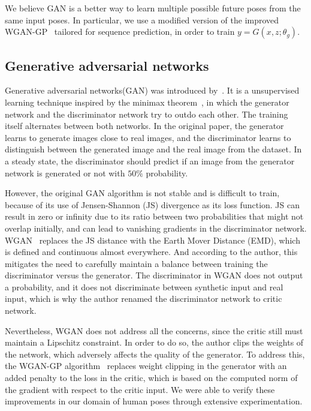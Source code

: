 \documentclass[10pt,twocolumn,letterpaper]{article}
\begin{document}
We believe GAN is a better way to learn multiple possible future poses from the same input poses. In particular, we use a modified version of the improved WGAN-GP~\cite{corr2017:Ishaan} tailored for sequence prediction, in order to train $y = G(x,z;\theta_{g})$.

\subsection{Generative adversarial networks}

Generative adversarial networks(GAN) was introduced by~\cite{nips2014:Goodfellow}. It is a unsupervised learning technique inspired by the minimax theorem~\cite{pjm1958:Sion}, in which the generator network and the discriminator network try to outdo each other. The training itself alternates between both networks. In the original paper, the generator learns to generate images close to real images, and the discriminator learns to distinguish between the generated image and the real image from the dataset. In a steady state, the discriminator should predict if an image from the generator network is generated or not with $50\%$ probability.

However, the original GAN algorithm is not stable and is difficult to train, because of its use of Jensen-Shannon (JS) divergence as its loss function. JS can result in zero or infinity due to its ratio between two probabilities that might not overlap initially, and can lead to vanishing gradients in the discriminator network. WGAN~\cite{corr2017:Arjovsky} replaces the JS distance with the Earth Mover Distance (EMD), which is defined and continuous almost everywhere. And according to the author, this mitigates the need to carefully maintain a balance between training the discriminator versus the generator. The discriminator in WGAN does not output a probability, and it does not discriminate between synthetic input and real input, which is why the author renamed the discriminator network to critic network.

Nevertheless, WGAN does not address all the concerns, since the critic still must maintain a Lipschitz constraint. In order to do so, the author clips the weights of the network, which adversely affects the quality of the generator. To address this, the WGAN-GP algorithm~\cite{corr2017:Ishaan} replaces weight clipping in the generator with an added penalty to the loss in the critic, which is based on the computed norm of the gradient with respect to the critic input. We were able to verify these improvements in our domain of human poses through extensive experimentation.
\end{document}
